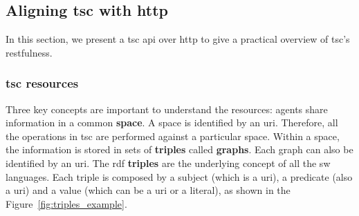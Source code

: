 


\subsection{Aligning \acs{tsc} with \acs{http}}


In this section, we present a \ac{tsc} \acs{api} over \ac{http} to give a practical overview of \ac{tsc}'s \acs{rest}fulness.


\subsubsection{\acs{tsc} resources}

Three key concepts are important to understand the resources: agents share information in a common \textbf{space}.
A space is identified by an \acs{uri}.
Therefore, all the operations in \ac{tsc} are performed against a particular space.
Within a space, the information is stored in sets of \textbf{triples} called \textbf{graphs}.
Each graph can also be identified by an \acs{uri}.
The \acs{rdf} \textbf{triples} are the underlying concept of all the \ac{sw} languages.
Each triple is composed by a subject (which is a \acs{uri}), a predicate (also a \acs{uri}) and a value (which can be a \acs{uri} or a literal), as shown in the Figure~\ref{fig:triples_example}.

